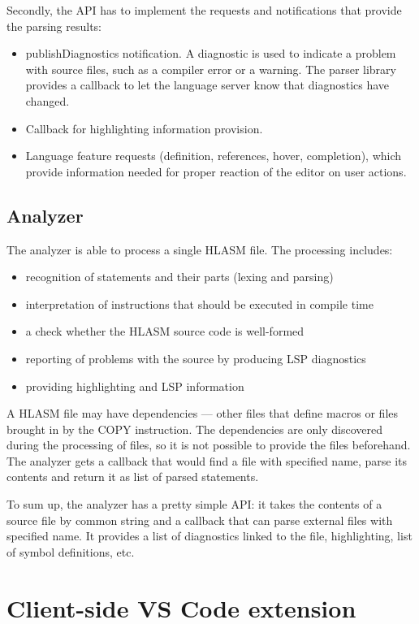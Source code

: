 Secondly, the API has to implement the requests and notifications that provide the parsing results:
\begin{itemize}
	\item publishDiagnostics notification. A diagnostic is used to indicate a problem with source files, such as a compiler error or a warning. The parser library provides a callback to let the language server know that diagnostics have changed.
	\item Callback for highlighting information provision.
	\item Language feature requests (definition, references, hover, completion), which provide information needed for proper reaction of the editor on user actions.
\end{itemize}

\subsection{Analyzer}

The analyzer is able to process a single HLASM file. The processing includes:
\begin{itemize}
 \item recognition of statements and their parts (lexing and parsing)
 \item interpretation of instructions that should be executed in compile time
 \item a check whether the HLASM source code is well-formed
 \item reporting of problems with the source by producing LSP diagnostics
 \item providing highlighting and LSP information
\end{itemize}

A HLASM file may have dependencies --- other files that define macros or files brought in by the COPY instruction. The dependencies are only discovered during the processing of files, so it is not possible to provide the files beforehand. The analyzer gets a callback that would find a file with specified name, parse its contents and return it as list of parsed statements. 

To sum up, the analyzer has a pretty simple API: it takes the contents of a source file by common string and a callback that can parse external files with specified name. It provides a list of diagnostics linked to the file, highlighting, list of symbol definitions, etc.

\section{Client-side VS Code extension}
\label{arch:client}

